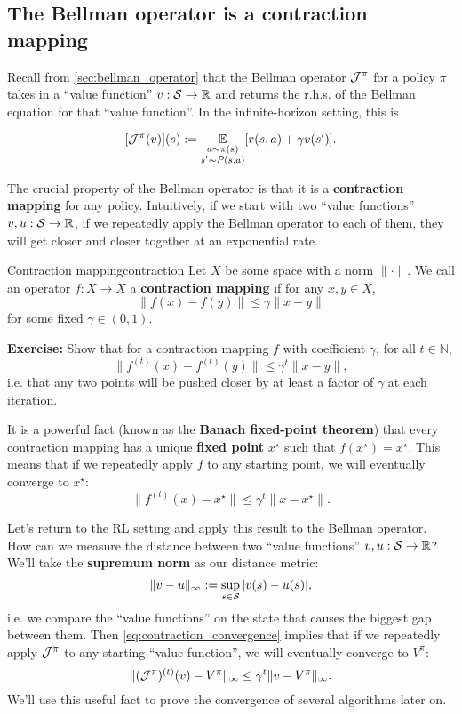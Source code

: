 \documentclass[\main/main]{subfiles}
\begin{document}
\subsection{The Bellman operator is a contraction mapping}

Recall from \ref{sec:bellman_operator} that the Bellman operator $\bop^{\pi}$ for a policy $\pi$ takes in a ``value function'' $v : \S \to \R$ and returns the r.h.s. of the Bellman equation for that ``value function''. In the infinite-horizon setting, this is

\[
    [\bop^{\pi}(v)](s) := \E_{\substack{a \sim \pi(s) \\ s' \sim P(s, a)}} [r(s, a) + \gamma v(s')].
\]

The crucial property of the Bellman operator is that it is a \textbf{contraction mapping} for any policy. Intuitively, if we start with two ``value functions'' $v, u : \S \to \R$, if we repeatedly apply the Bellman operator to each of them, they will get closer and closer together at an exponential rate.

\begin{definition}{Contraction mapping}{contraction}
    Let $X$ be some space with a norm $\|\cdot\|$. We call an operator $f: X \to X$ a \textbf{contraction mapping} if for any $x, y \in X$,
    \[
        \|f(x) - f(y)\| \le \gamma \|x - y\|
    \]
    for some fixed $\gamma \in (0, 1)$.
\end{definition}

\textbf{Exercise:} Show that for a contraction mapping $f$ with coefficient $\gamma$, for all $t \in \mathbb{N}$,
\[
    \|f^{(t)}(x) - f^{(t)}(y)\| \le \gamma^t \|x - y\|,
\]
i.e. that any two points will be pushed closer by at least a factor of $\gamma$ at each iteration.

It is a powerful fact (known as the \textbf{Banach fixed-point theorem}) that every contraction mapping has a unique \textbf{fixed point} $x^\star$ such that $f(x^\star) = x^\star$. This means that if we repeatedly apply $f$ to any starting point, we will eventually converge to $x^\star$:
\begin{equation}
    \|f^{(t)}(x) - x^\star\| \le \gamma^t \|x - x^\star\|. \label{eq:contraction_convergence}
\end{equation}

Let's return to the RL setting and apply this result to the Bellman operator. How can we measure the distance between two ``value functions'' $v, u : \S \to \R$? We'll take the \textbf{supremum norm} as our distance metric:
\[
    \| v - u \|_{\infty} := \sup_{s \in \S} |v(s) - u(s)|,
\]
i.e. we compare the ``value functions'' on the state that causes the biggest gap between them.
Then \eqref{eq:contraction_convergence} implies that if we repeatedly apply $\bop^\pi$ to any starting ``value function'', we will eventually converge to $V^\pi$:
\begin{equation}
    \|(\bop^\pi)^{(t)}(v) - V^\pi \|_{\infty} \le \gamma^{t} \| v - V^\pi\|_{\infty}. \label{eq:bellman_convergence}
\end{equation}
We'll use this useful fact to prove the convergence of several algorithms later on.
\end{document}
